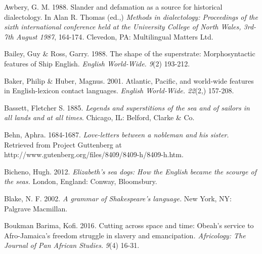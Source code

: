 \begin{styleStandard}
Awbery, G. M. 1988. Slander and defamation as a source for historical dialectology. In Alan R. Thomas (ed.,) \textit{Methods in dialectology: Proceedings of the sixth international conference held at the University College of North Wales, 3rd-7th August 1987}, 164-174\textit{.} Clevedon, PA: Multilingual Matters Ltd.
\end{styleStandard}

\begin{styleStandard}
Bailey, Guy \& Ross, Garry. 1988. The shape of the superstrate: Morphosyntactic features of Ship English. \textit{English World-Wide. 9}(2) 193-212.
\end{styleStandard}

\begin{styleStandard}
Baker, Philip \& Huber, Magnus. 2001. Atlantic, Pacific, and world-wide features in English-lexicon contact languages. \textit{English World-Wide. 22}(2,) 157-208.
\end{styleStandard}

\begin{styleStandard}
Bassett, Fletcher S. 1885. \textit{Legends and superstitions of the sea and of sailors in all lands and at all times}. Chicago, IL: Belford, Clarke \& Co. 
\end{styleStandard}

\begin{styleStandard}
Behn, Aphra. 1684-1687. \textit{Love-letters between a nobleman and his sister}. Retrieved from Project Guttenberg at http://www.gutenberg.org/files/8409/8409-h/8409-h.htm.
\end{styleStandard}

\begin{styleStandard}
Bicheno, Hugh. 2012. \textit{Elizabeth’s sea dogs: How the English became the scourge of the seas. }London, England: Conway, Bloomsbury.
\end{styleStandard}

\begin{styleStandard}
Blake, N. F. 2002. \textit{A grammar of Shakespeare’s language. }New York, NY: Palgrave Macmillan.
\end{styleStandard}

\begin{styleStandard}
Boukman Barima, Kofi. 2016\textit{. }Cutting across space and time: Obeah’s service to Afro-Jamaica’s freedom struggle in slavery and emancipation\textit{. Africology: The Journal of Pan African Studies.} \textit{9}(4) 16-31.
\end{styleStandard}

